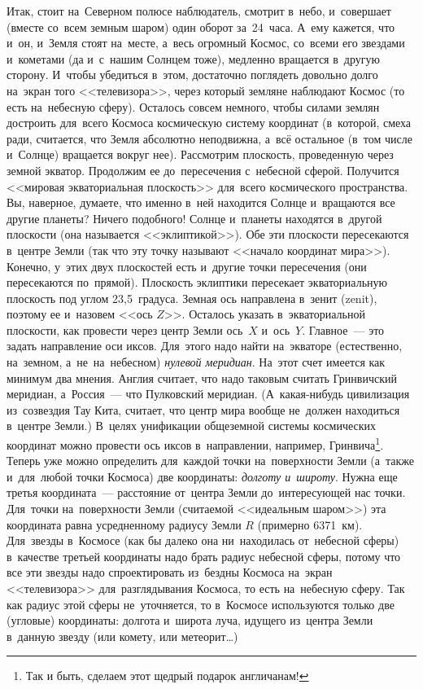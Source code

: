 Итак, стоит на~Северном полюсе наблюдатель, смотрит в~небо, и~совершает (вместе со~всем земным
шаром) один оборот за~24~часа. А~ему кажется, что и~он, и~Земля стоят на~месте, а~весь огромный
Космос, со~всеми его звездами и~кометами (да и~с~нашим Солнцем тоже), медленно вращается в~другую
сторону. И~чтобы убедиться в~этом, достаточно поглядеть довольно долго на~экран того <<телевизора>>,
через который земляне наблюдают Космос (то есть на~небесную сферу). Осталось совсем немного, чтобы
силами землян достроить для~всего Космоса космическую систему координат (в~которой, смеха ради,
считается, что Земля абсолютно неподвижна, а~всё остальное (в~том числе и~Солнце) вращается вокруг
нее). Рассмотрим плоскость, проведенную через земной экватор. Продолжим ее до~пересечения
с~небесной сферой. Получится <<мировая экваториальная плоскость>> для~всего космического
пространства. Вы, наверное, думаете, что именно в~ней находится Солнце и~вращаются все другие
планеты? Ничего подобного! Солнце и~планеты находятся в~другой плоскости (она называется
<<эклиптикой>>). Обе эти плоскости пересекаются в~центре Земли (так что эту точку называют <<начало
координат мира>>). Конечно, у~этих двух плоскостей есть и~другие точки пересечения (они пересекаются
по~прямой). Плоскость эклиптики пересекает экваториальную плоскость под углом 23,5~градуса. Земная
ось направлена в~зенит (zenit), поэтому ее и~назовем <<ось $Z$>>. Осталось указать в~экваториальной
плоскости, как провести через центр Земли ось~$X$ и~ось~$Y$. Главное~--- это задать направление оси
иксов. Для~этого надо найти на~экваторе (естественно, на~земном, а~не~на~небесном) \textit{нулевой
меридиан}. На~этот счет имеется как минимум два мнения. Англия считает, что надо таковым считать
Гринвичский меридиан, а~Россия~--- что Пулковский меридиан. (А~какая-нибудь цивилизация
из~созвездия Тау Кита, считает, что центр мира вообще не~должен находиться в~центре Земли.) В~целях
унификации общеземной системы космических координат можно провести ось иксов в~направлении,
например, Гринвича\footnote{Так и быть, сделаем этот щедрый подарок англичанам!}.
 Теперь уже можно определить для~каждой точки на~поверхности Земли (а~также
и~для~любой точки Космоса) две координаты: \textit{долготу и~широту}. Нужна еще третья координата~---
расстояние от~центра Земли до~интересующей нас точки. Для~точки на~поверхности Земли (считаемой
<<идеальным шаром>>) эта координата равна усредненному радиусу Земли $R$ (примерно 6371~км). Для~звезды
в~Космосе (как бы далеко она ни~находилась от~небесной сферы)
 в~качестве третьей координаты надо
брать радиус небесной сферы, потому что все эти звезды надо спроектировать из~бездны Космоса
на~экран <<телевизора>> для~разглядывания Космоса, то есть на~небесную сферу. Так как радиус этой
сферы не~уточняется, то в~Космосе используются только две (угловые) координаты: долгота и~широта
луча, идущего из~центра Земли в~данную звезду (или комету, или метеорит\ldots)

